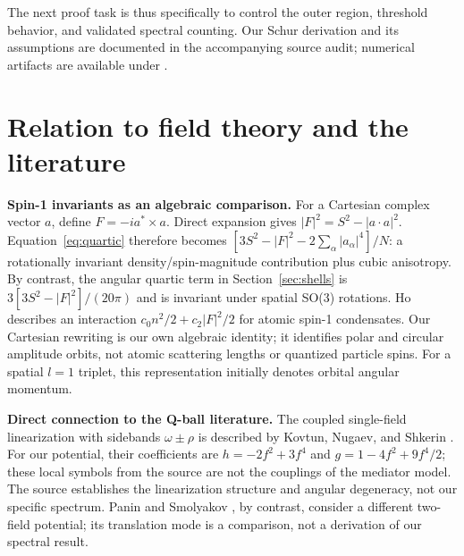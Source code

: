\documentclass[a4paper,11pt]{article}
\begin{document}
The next proof task is thus specifically to control the outer region, threshold behavior, and validated spectral counting. Our Schur derivation and its assumptions are documented in the accompanying source audit; numerical artifacts are available under .

\section{Relation to field theory and the literature}\label{sec:literature}
\textbf{Spin-1 invariants as an algebraic comparison.}
For a Cartesian complex vector $a$, define $F=-ia^*\times a$. Direct expansion gives $|F|^2=S^2-|a\cdot a|^2$. Equation~\eqref{eq:quartic} therefore becomes $[3S^2-|F|^2-2\sum_\alpha|a_\alpha|^4]/N$: a rotationally invariant density/spin-magnitude contribution plus cubic anisotropy. By contrast, the angular quartic term in Section~\ref{sec:shells} is $3[3S^2-|F|^2]/(20\pi)$ and is invariant under spatial SO(3) rotations. Ho \cite[Eqs.~(4)--(8)]{Ho} describes an interaction $c_0n^2/2+c_2|F|^2/2$ for atomic spin-1 condensates. Our Cartesian rewriting is our own algebraic identity; it identifies polar and circular amplitude orbits, not atomic scattering lengths or quantized particle spins. For a spatial $l=1$ triplet, this representation initially denotes orbital angular momentum.

\textbf{Direct connection to the Q-ball literature.}
The coupled single-field linearization with sidebands $\omega\pm\rho$ is described by Kovtun, Nugaev, and Shkerin \cite[Eqs.~(11)--(15)]{Kovtun}. For our potential, their coefficients are $h=-2f^2+3f^4$ and $g=1-4f^2+9f^4/2$; these local symbols from the source are not the couplings of the mediator model. The source establishes the linearization structure and angular degeneracy, not our specific spectrum. Panin and Smolyakov \cite{Panin}, by contrast, consider a different two-field potential; its translation mode is a comparison, not a derivation of our spectral result.
\end{document}
